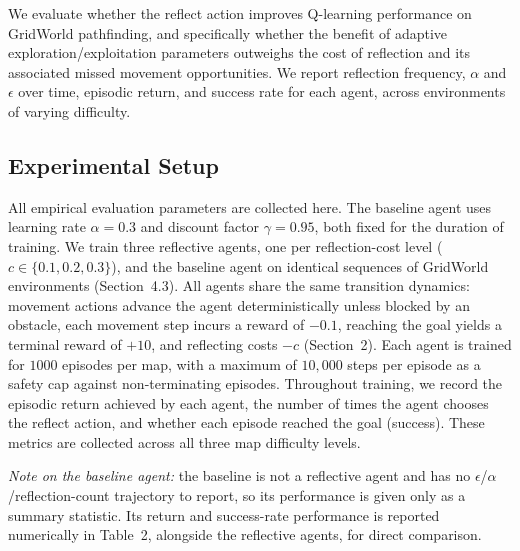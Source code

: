 \documentclass[11pt]{article}
\begin{document}
We evaluate whether the reflect action improves Q-learning performance on GridWorld pathfinding, and specifically whether the benefit of adaptive exploration/exploitation parameters outweighs the cost of reflection and its associated missed movement opportunities. We report reflection frequency, $\alpha$ and $\epsilon$ over time, episodic return, and success rate for each agent, across environments of varying difficulty.

\subsection{Experimental Setup}

All empirical evaluation parameters are collected here. The baseline agent uses learning rate $\alpha = 0.3$ and discount factor $\gamma = 0.95$, both fixed for the duration of training. We train three reflective agents, one per reflection-cost level ($c \in \{0.1, 0.2, 0.3\}$), and the baseline agent on identical sequences of GridWorld environments (Section~4.3). All agents share the same transition dynamics: movement actions advance the agent deterministically unless blocked by an obstacle, each movement step incurs a reward of $-0.1$, reaching the goal yields a terminal reward of $+10$, and reflecting costs $-c$ (Section~2). Each agent is trained for $1000$ episodes per map, with a maximum of $10{,}000$ steps per episode as a safety cap against non-terminating episodes. Throughout training, we record the episodic return achieved by each agent, the number of times the agent chooses the reflect action, and whether each episode reached the goal (success). These metrics are collected across all three map difficulty levels.

\emph{Note on the baseline agent:} the baseline is not a reflective agent and has no $\epsilon$/$\alpha$/reflection-count trajectory to report, so its performance is given only as a summary statistic. Its return and success-rate performance is reported numerically in Table~2, alongside the reflective agents, for direct comparison.
\end{document}
